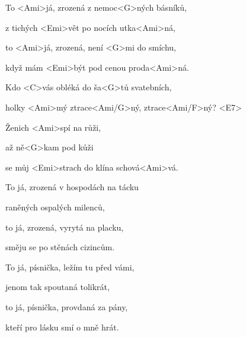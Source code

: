 

\zs
To <Ami>já, zrozená z nemoc<G>ných básníků,

z tichých <Emi>vět po nocích utka<Ami>ná,

to <Ami>já, zrozená, není <G>mi do smíchu,

když mám <Emi>být pod cenou proda<Ami>ná.
\ks

\zr
Kdo <C>vás obléká do ša<G>tů svatebních,

holky <Ami>mý ztrace<Ami/G>ný, ztrace<Ami/F>ný? <E7> 

Ženich <Ami>spí na růži,

až ně<G>kam pod kůži 

se můj <Emi>strach do klína schová<Ami>vá.
\kr

\zs
To já, zrozená v hospodách na tácku

raněných ospalých milenců,

to já, zrozená, vyrytá na placku,

směju se po stěnách cizincům.
\ks

\zr	\kr

\zs
To já, písnička, ležím tu před vámi,

jenom tak spoutaná tolikrát,

to já, písnička, provdaná za pány,

kteří pro lásku smí o mně hrát.
\ks

\zr	\kr
\kp
